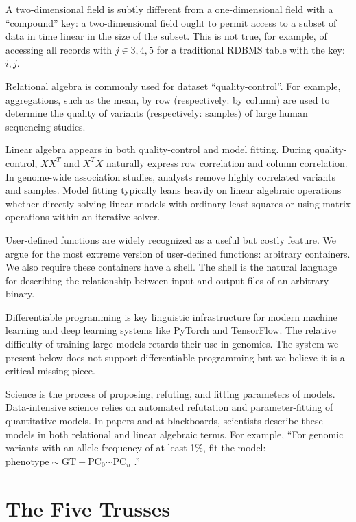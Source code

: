 \documentclass[10pt]{article}
\begin{document}
A two-dimensional field is subtly different from a one-dimensional field with a ``compound'' key: a two-dimensional field ought to permit access to a subset of data in time linear in the size of the subset.
This is not true, for example, of accessing all records with $j \in {3, 4, 5}$ for a traditional RDBMS table with the key: $i, j$.

Relational algebra is commonly used for dataset ``quality-control''. For example, aggregations, such as the mean, by row (respectively: by column) are used to determine the quality of variants (respectively: samples) of large human sequencing studies.

Linear algebra appears in both quality-control and model fitting.
During quality-control, $XX^T$ and $X^TX$ naturally express row correlation and column correlation.
In genome-wide association studies, analysts remove highly correlated variants and samples.
Model fitting typically leans heavily on linear algebraic operations whether directly solving linear models with ordinary least squares or using matrix operations within an iterative solver.

User-defined functions are widely recognized as a useful but costly feature.
We argue for the most extreme version of user-defined functions: arbitrary containers.
We also require these containers have a shell.
The shell is the natural language for describing the relationship between input and output files of an arbitrary binary.

Differentiable programming is key linguistic infrastructure for modern machine learning and deep learning systems like PyTorch and TensorFlow.
The relative difficulty of training large models retards their use in genomics.
The system we present below does not support differentiable programming but we believe it is a critical missing piece.

Science is the process of proposing, refuting, and fitting parameters of models.
Data-intensive science relies on automated refutation and parameter-fitting of quantitative models.
In papers and at blackboards, scientists describe these models in both relational and linear algebraic terms.
For example, ``For genomic variants with an allele frequency of at least 1\%, fit the model:
$\mathrm{phenotype} \sim \mathrm{GT} + \mathrm{PC}_0 \cdots \mathrm{PC}_n$
.''

\section{The Five Trusses}
\end{document}
